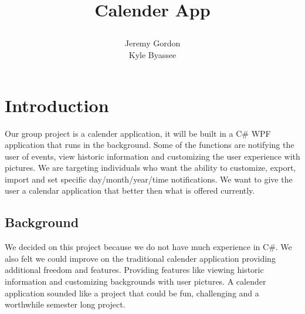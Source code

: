 \documentclass[10pt,conference,onecolumn,compsoc]{IEEEtran}
\begin{document}
\title{Calender App
%
%


\author{Jeremy Gordon\\ Kyle Byassee%
}
}


\maketitle



\IEEEdisplaynontitleabstractindextext

\IEEEpeerreviewmaketitle



\section{Introduction}

Our group project is a calender application, it will be built in a C\# WPF application that runs in the background. Some of the functions are notifying the user of events, view historic information and customizing the user experience with pictures. We are targeting individuals who want the ability to customize, export, import and set specific day/month/year/time notifications. 
We want to give the user a calendar application that better then what is offered currently.

\subsection{Background}
We decided on this project because we do not have much experience in C\#. We also felt we could improve on the traditional calender application providing additional freedom and features. Providing features like viewing historic information and customizing backgrounds with user pictures. A calender application sounded like a project that could be fun, challenging and a worthwhile semester long project.
\end{document}
